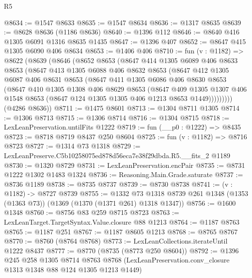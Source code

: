 \begin{lexlean}{R5}
\begin{coremodule}
@8634 := @1547 @8633
@8635 := @1547 @8634
@8636 := @1317 @8635
@8639 := @8628 @8636 (@1186 @8636)
@8640 := @1396 @112
@8646 := @8640 @416 @1305 @6091 @1316 @8635 @1435
@8647 := @1396 @407
@8652 := @8647 @415 @1305 @6090 @406 @8634
@8653 := @1406 @406
@8710 := fun (v : @1182) =>
  @8622
    (@8639
      (@8646
        (@8652
          @8653
          (@8647
            @414
            @1305
            @6089
            @406
            @8633
            @8653
            (@8647
              @413
              @1305
              @6088
              @406
              @8632
              @8653
              (@8647
                @412
                @1305
                @6087
                @406
                @8631
                @8653
                (@8647
                  @411
                  @1305
                  @6086
                  @406
                  @8630
                  @8653
                  (@8647
                    @410
                    @1305
                    @1308
                    @406
                    @8629
                    @8653
                    (@8647
                      @409
                      @1305
                      @1307
                      @406
                      @1548
                      @8653
                      (@8647 @124 @1305 @1305 @406 @1213 @8653 @1449)))))))))
      (@4286 @8636))
@8711 := @1475 @8601
@8713 := @1304 @8711 @1305
@8714 := @1306 @8713
@8715 := @1306 @8714
@8716 := @1304 @8715
@8718 := LexLeanPreservation.untilFits @1222
@8719 := fun (__p0 : @1222) => @8435
@8723 := @8718 @8719 @8437 @250 @8604
@8725 := fun (v : @1182) => @8716 @8723
@8727 := @1314 @73 @1318
@8729 := LexLeanPreserve.C5b10258075ed878d56eca7e38f29dbda.R5.__fits_2 @1189
@8730 := @1320 @8729
@8731 := LexLeanPreservation.encPair
@8735 := @8731 @1222 @1302 @1483 @1324
@8736 := Reasoning.Main.Grade.saturate
@8737 := @8736 @1189
@8738 := @8735 @8737
@8739 := @8730 @8738
@8741 := (v : @1182) -> @8727 @8739
@8755 := @1332
    @73
    @1318
    @8739
    @261
    @1348
    (@1353 (@1363 @73))
    (@1369 (@1370 (@1371 @261) @1318 @1347))
@8756 := @1600 @1348
@8760 := @8756 @83 @259 @8715 @8723
@8763 := LexLeanTarget.TargetSyntax.Value.closure @88 @1213
@8764 := @1187 @8763
@8765 := @1187 @251
@8767 := @1187 @8605 @1213
@8768 := @8765 @8767
@8770 := @8760 (@8764 @8768)
@8773 := LexLeanCollections.iterateUntil @1222 @8437
@8777 := @8770 (@8735 (@8773 @250 @8604))
@8792 := @1396
    @245
    @258
    @1305
    @8714
    @8763
    @8768
    (LexLeanPreservation.conv_closure @1313 @1348 @88 @124 @1305 @1213 @1449)

\end{coremodule}
\end{lexlean}
